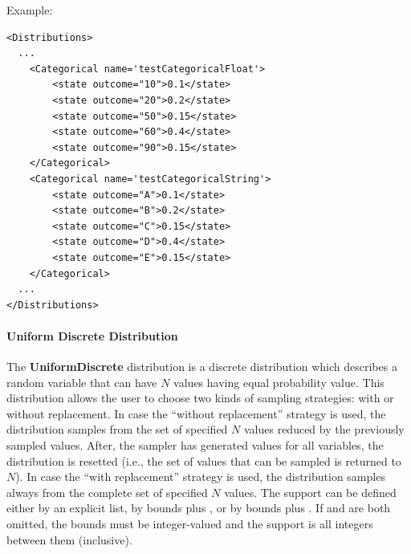 Example:
\begin{lstlisting}[style=XML]
<Distributions>
  ...
    <Categorical name='testCategoricalFloat'>
        <state outcome="10">0.1</state>
        <state outcome="20">0.2</state>
        <state outcome="50">0.15</state>
        <state outcome="60">0.4</state>
        <state outcome="90">0.15</state>
    </Categorical>
    <Categorical name='testCategoricalString'>
        <state outcome="A">0.1</state>
        <state outcome="B">0.2</state>
        <state outcome="C">0.15</state>
        <state outcome="D">0.4</state>
        <state outcome="E">0.15</state>
    </Categorical>
  ...
</Distributions>
\end{lstlisting}

\paragraph{Uniform Discrete Distribution}
\label{subsec:UniformDiscrete}

The \textbf{UniformDiscrete} distribution is a discrete distribution which describes a random variable
that can have $N$ values having equal probability value.
This distribution allows the user to choose two kinds of sampling strategies: with or without replacement.
In case the ``without replacement'' strategy is used, the distribution samples from the set of specified $N$ values
reduced by the previously sampled values.
After, the sampler has generated values for all variables, the distribution is
resetted (i.e., the set of values that can be sampled is returned to $N$).
In case the ``with replacement'' strategy is used, the distribution samples always from the complete set of specified $N$ values.
The support can be defined either by an explicit  list, by bounds plus ,
or by bounds plus . If  and  are both omitted,
the bounds must be integer-valued and the support is all integers between them (inclusive).

